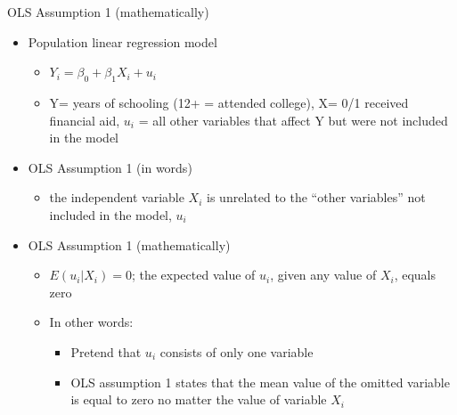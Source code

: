 \documentclass[
  8pt,
  ignorenonframetext,
  dvipsnames]{beamer}
\providecommand{\tightlist}{%
  \setlength{\itemsep}{0pt}\setlength{\parskip}{0pt}}
\let\olditem\item
\renewcommand{\item}{%
  \olditem\vspace{4pt}
}
\begin{document}
\begin{frame}{OLS Assumption 1 (mathematically)}
\protect\hypertarget{ols-assumption-1-mathematically}{}

\begin{itemize}
\tightlist
\item
  Population linear regression model

  \begin{itemize}
  \tightlist
  \item
    \(Y_i = \beta_0 + \beta_1 X_i+ u_i\)
  \item
    Y= years of schooling (12+ = attended college), X= 0/1 received
    financial aid, \(u_i\) = all other variables that affect Y but were
    not included in the model
  \end{itemize}
\item
  OLS Assumption 1 (in words)

  \begin{itemize}
  \tightlist
  \item
    the independent variable \(X_i\) is unrelated to the ``other
    variables'' not included in the model, \(u_i\)
  \end{itemize}
\item
  OLS Assumption 1 (mathematically)

  \begin{itemize}
  \tightlist
  \item
    \(E(u_i|X_i)=0\); the expected value of \(u_i\), given any value of
    \(X_i\), equals zero
  \item
    In other words:

    \begin{itemize}
    \tightlist
    \item
      Pretend that \(u_i\) consists of only one variable
    \item
      OLS assumption 1 states that the mean value of the omitted
      variable is equal to zero no matter the value of variable \(X_i\)
    \end{itemize}
  \end{itemize}
\end{itemize}

\end{frame}
\end{document}
